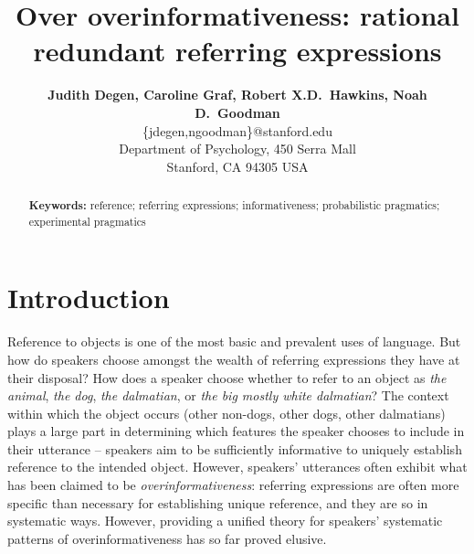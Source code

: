 \documentclass[11pt]{article}
\title{Over overinformativeness: rational redundant referring expressions}
\author{{\large \bf Judith Degen, Caroline Graf, Robert X.D.~Hawkins, Noah D.~Goodman} \\
  \{jdegen,ngoodman\}@stanford.edu\\
  Department of Psychology, 450 Serra Mall \\
  Stanford, CA 94305 USA}
\begin{document}
\maketitle


\begin{abstract}
 

\textbf{Keywords:} 
reference; referring expressions; informativeness; probabilistic pragmatics; experimental pragmatics
\end{abstract}

\section{Introduction}
\label{sec:intro}

Reference to objects is one of the most basic and prevalent uses of language. But how do speakers choose amongst the wealth of referring expressions they have at their disposal? How does a speaker choose whether to refer to an object as \emph{the animal}, \emph{the dog}, \emph{the dalmatian}, or \emph{the big mostly white dalmatian}? The context within which the object occurs  (other non-dogs, other dogs, other dalmatians) plays a large part in determining which features the speaker chooses to include in their utterance  -- speakers aim to be sufficiently informative to uniquely establish reference to the intended object. However, speakers' utterances often exhibit what has been claimed to be \emph{overinformativeness}: referring expressions are often more specific than necessary for establishing unique reference, and they are so in systematic ways. However, providing a unified theory for speakers' systematic patterns of overinformativeness has so far proved elusive.
\end{document}

